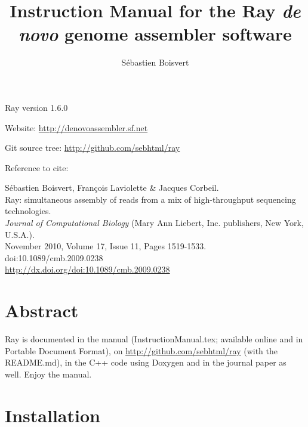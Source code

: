 \documentclass{article}
\begin{document}
\author{Sébastien Boisvert}
\title{Instruction Manual for the Ray \emph{de novo} genome assembler software}
\maketitle


\vspace{2cm}
Ray version 1.6.0

\vspace{2cm}

Website: \href{http://denovoassembler.sf.net}{http://denovoassembler.sf.net}

\vspace{0.4cm}

Git source tree: \href{http://github.com/sebhtml/ray}{http://github.com/sebhtml/ray}

\vspace{2cm}

Reference to cite: 
\vspace{2cm}

\noindent
Sébastien Boisvert, François Laviolette \& Jacques Corbeil.\\
Ray: simultaneous assembly of reads from a mix of high-throughput sequencing technologies.\\
\emph{Journal of Computational Biology} (Mary Ann Liebert, Inc. publishers, New York, U.S.A.).\\
November 2010, Volume 17, Issue 11, Pages 1519-1533.\\
doi:10.1089/cmb.2009.0238\\
\href{http://dx.doi.org/doi:10.1089/cmb.2009.0238}{http://dx.doi.org/doi:10.1089/cmb.2009.0238}


\newpage
\tableofcontents
\newpage

\section{Abstract}

Ray is documented in the manual (InstructionManual.tex; available
online and in Portable Document Format), 
on
\href{http://github.com/sebhtml/ray}{http://github.com/sebhtml/ray}
 (with the README.md), in the 
C++ code using Doxygen and in the journal paper as well.
Enjoy the manual.

\section{Installation}
\end{document}
